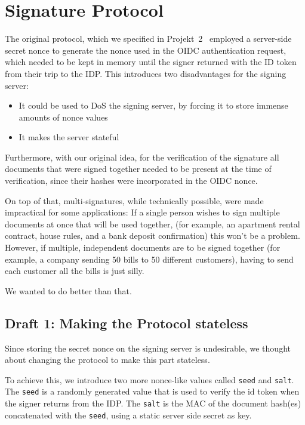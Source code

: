 \section{Signature Protocol}\label{sec:flaws-of-the-original-protocol}
The original protocol,
which we specified in Projekt~2~\cite{projekt2} employed a server-side secret nonce to generate the nonce used in the \gls{OIDC} authentication request,
which needed to be kept in memory until the signer returned with the ID token from their trip to the \gls{IDP}.
This introduces two disadvantages for the signing server:
\begin{itemize}
    \item It could be used to \gls{DoS} the signing server, by forcing it to store immense amounts of nonce values
    \item It makes the server stateful
\end{itemize}


Furthermore, with our original idea,
for the verification of the signature all documents that were signed together needed to be present at the time of verification,
since their hashes were incorporated in the \gls{OIDC} nonce.

On top of that, multi-signatures, while technically possible, were made impractical for some applications:
If a single person wishes to sign multiple documents at once that will be used together,
(for example, an apartment rental contract, house rules, and a bank deposit confirmation)
this won't be a problem.
However, if multiple, independent documents are to be signed together
(for example, a company sending 50 bills to 50 different customers),
having to send each customer all the bills is just silly.

We wanted to do better than that.

\subsection{Draft 1: Making the Protocol stateless}\label{subsec:draft-1:-making-the-protocol-stateless}
Since storing the secret nonce on the signing server is undesirable,
we thought about changing the protocol to make this part stateless.

To achieve this, we introduce two more nonce-like values called \texttt{seed} and \texttt{salt}.
The \texttt{seed} is a randomly generated value that is used to verify the id token when the signer returns from the \gls{IDP}.
The \texttt{salt} is the \gls{MAC} of the document hash(es) concatenated with the \texttt{seed}, using a static server side secret as key.


